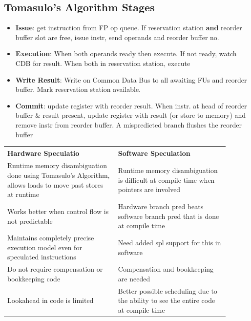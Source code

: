 \documentclass{article}
\begin{document}
\subsection{Tomasulo's Algorithm Stages}
\begin{itemize}
    \item \textbf{Issue}: get instruction from FP op queue. If reservation station \textbf{and} reorder buffer slot are free, issue instr, send operands and reorder buffer no.
    
    \item \textbf{Execution}: When both operands ready then execute. If not ready, watch CDB for result. When both in reservation station, execute

    \item \textbf{Write Result}: Write on Common Data Bus to all awaiting FUs and reorder buffer. Mark reservation station available.
    
    \item \textbf{Commit}: update register with reorder result. When instr. at head of reorder buffer \& result present, update register with result (or store to memory) and remove instr from reorder buffer. A mispredicted branch flushes the reorder buffer
\end{itemize}

\begin{tabular}{|p{0.45\linewidth}|p{0.45\linewidth}|}
    \hline
    \textbf{Hardware Speculatio} & \textbf{Software Speculation}  \\
    \hline
    Runtime memory disambiguation done using Tomasulo's Algorithm, allows loads to move past stores at runtime & Runtime memory disambiguation is difficult at compile time when pointers are involved \\
    \hline
    Works better when control flow is not predictable & Hardware branch pred beats software branch pred that is done at compile time \\
    \hline 
    Maintains completely precise execution model even for speculated instructions & Need added spl support for this in software \\
    \hline
    Do not require compensation or bookkeeping code & Compensation and bookkeeping are needed \\
    \hline 
    Lookahead in code is limited & Better possible scheduling due to the ability to see the entire code at compile time \\
    \hline
\end{tabular}
\end{document}
